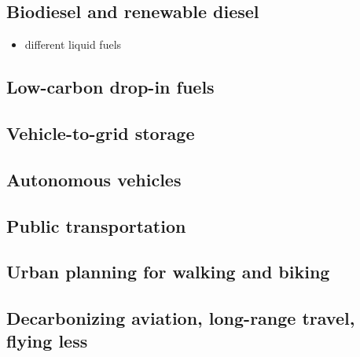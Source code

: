 \subsection{Biodiesel and renewable diesel}
\begin{itemize}
	\item different liquid fuels
\end{itemize}

\subsection{Low-carbon drop-in fuels}

\subsection{Vehicle-to-grid storage}

\subsection{Autonomous vehicles}

\subsection{Public transportation}

\subsection{Urban planning for walking and biking}

\subsection{Decarbonizing aviation, long-range travel, flying less}
